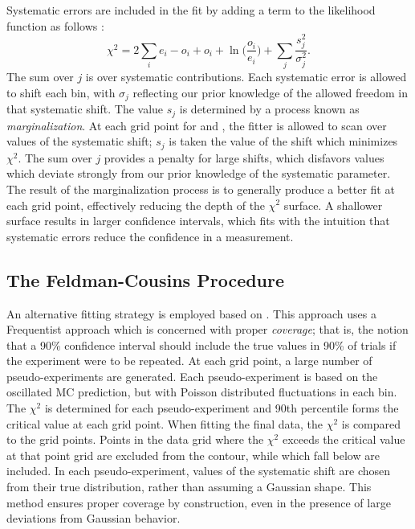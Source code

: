 Systematic errors are included in the fit by adding a term to the likelihood
function as follows \cite{pdg}:
\begin{equation}
\chi^2 = 2 \sum_i e_i - o_i + o_i + \ln \bigg (\frac{o_i}{e_i} \bigg)
+ \sum_j \frac{s_j^2}{\sigma_j^2}.
\end{equation}
The sum over $j$ is over systematic contributions.  Each systematic error
is allowed to shift each bin, with $\sigma_j$ reflecting our prior
knowledge of the allowed freedom in that systematic shift.
The value $s_j$ is determined by a process known as \textit{marginalization}.
At each grid point for \deltamtht and \thetatth, the fitter is allowed to scan
over values of the systematic shift; $s_j$ is taken the value of the shift
which minimizes $\chi^2$.
The sum over $j$ provides a penalty for large shifts, which disfavors values
which deviate strongly from our prior knowledge of the systematic parameter.
The result of the marginalization process is to generally produce a better fit
at each grid point, effectively reducing the depth of the $\chi^2$ surface.
A shallower surface results in larger confidence intervals, which fits with
the intuition that systematic errors reduce the confidence in a measurement.

\subsection{The Feldman-Cousins Procedure}
\label{feldman_cousins_section}

An alternative fitting strategy is employed based on \cite{feldman1998unified}.
This approach uses a Frequentist approach which is concerned with proper
\textit{coverage}; that is, the notion that a 90\% confidence interval
should include the true values in 90\% of trials if the experiment
were to be repeated.
At each grid point, a large number of pseudo-experiments are generated.
Each pseudo-experiment is based on the oscillated MC prediction, but with
Poisson distributed fluctuations in each bin.
The $\chi^2$ is determined for each pseudo-experiment
and 90th percentile forms the critical value at each grid point.
When fitting the final data, the $\chi^2$ is compared to the grid points.
Points in the data grid where the $\chi^2$ exceeds the critical value at that
point grid are excluded from the contour, while which fall below are included.
In each pseudo-experiment, values of the systematic shift are chosen from their
true distribution, rather than assuming a Gaussian shape.
This method ensures proper coverage by construction, even in the presence
of large deviations from Gaussian behavior.





